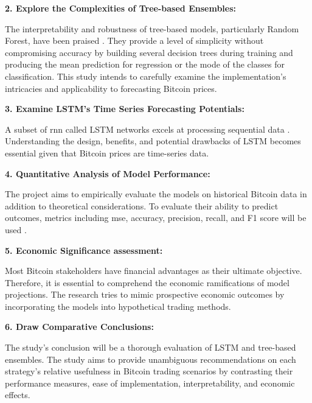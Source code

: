 \smallskip

\textbf{2.	Explore the Complexities of Tree-based Ensembles:}

\smallskip

The interpretability and robustness of tree-based models, particularly Random Forest, have been praised \citep{breiman_random_2001}. They provide a level of simplicity without compromising accuracy by building several decision trees during training and producing the mean prediction for regression or the mode of the classes for classification. This study intends to carefully examine the implementation's intricacies and applicability to forecasting Bitcoin prices.

\smallskip

\textbf{3.	Examine LSTM's Time Series Forecasting Potentials:}

\smallskip

A subset of \gls{rnn} called LSTM networks excels at processing sequential data \citep{Hochreiter1997LongSM}. Understanding the design, benefits, and potential drawbacks of LSTM becomes essential given that Bitcoin prices are time-series data.

\smallskip

\textbf{4.	Quantitative Analysis of Model Performance:}

\smallskip

The project aims to empirically evaluate the models on historical Bitcoin data in addition to theoretical considerations. To evaluate their ability to predict outcomes, metrics including \gls{mse}, accuracy, precision, recall, and F1 score will be used \citep{DBLP:books/lib/HastieTF09}.

\smallskip

\textbf{5.	Economic Significance assessment:}

\smallskip

Most Bitcoin stakeholders have financial advantages as their ultimate objective. Therefore, it is essential to comprehend the economic ramifications of model projections. The research tries to mimic prospective economic outcomes by incorporating the models into hypothetical trading methods.

\smallskip

\textbf{6.	Draw Comparative Conclusions: }

\smallskip

The study's conclusion will be a thorough evaluation of LSTM and tree-based ensembles. The study aims to provide unambiguous recommendations on each strategy's relative usefulness in Bitcoin trading scenarios by contrasting their performance measures, ease of implementation, interpretability, and economic effects.


